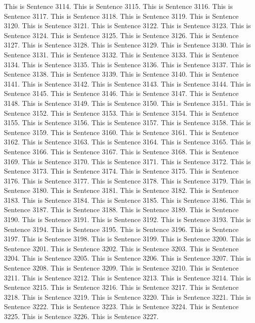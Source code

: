 \documentclass{article}
\begin{document}
This is Sentence 3114.
This is Sentence 3115.
This is Sentence 3116.
This is Sentence 3117.
This is Sentence 3118.
This is Sentence 3119.
This is Sentence 3120.
This is Sentence 3121.
This is Sentence 3122.
This is Sentence 3123.
This is Sentence 3124.
This is Sentence 3125.
This is Sentence 3126.
This is Sentence 3127.
This is Sentence 3128.
This is Sentence 3129.
This is Sentence 3130.
This is Sentence 3131.
This is Sentence 3132.
This is Sentence 3133.
This is Sentence 3134.
This is Sentence 3135.
This is Sentence 3136.
This is Sentence 3137.
This is Sentence 3138.
This is Sentence 3139.
This is Sentence 3140.
This is Sentence 3141.
This is Sentence 3142.
This is Sentence 3143.
This is Sentence 3144.
This is Sentence 3145.
This is Sentence 3146.
This is Sentence 3147.
This is Sentence 3148.
This is Sentence 3149.
This is Sentence 3150.
This is Sentence 3151.
This is Sentence 3152.
This is Sentence 3153.
This is Sentence 3154.
This is Sentence 3155.
This is Sentence 3156.
This is Sentence 3157.
This is Sentence 3158.
This is Sentence 3159.
This is Sentence 3160.
This is Sentence 3161.
This is Sentence 3162.
This is Sentence 3163.
This is Sentence 3164.
This is Sentence 3165.
This is Sentence 3166.
This is Sentence 3167.
This is Sentence 3168.
This is Sentence 3169.
This is Sentence 3170.
This is Sentence 3171.
This is Sentence 3172.
This is Sentence 3173.
This is Sentence 3174.
This is Sentence 3175.
This is Sentence 3176.
This is Sentence 3177.
This is Sentence 3178.
This is Sentence 3179.
This is Sentence 3180.
This is Sentence 3181.
This is Sentence 3182.
This is Sentence 3183.
This is Sentence 3184.
This is Sentence 3185.
This is Sentence 3186.
This is Sentence 3187.
This is Sentence 3188.
This is Sentence 3189.
This is Sentence 3190.
This is Sentence 3191.
This is Sentence 3192.
This is Sentence 3193.
This is Sentence 3194.
This is Sentence 3195.
This is Sentence 3196.
This is Sentence 3197.
This is Sentence 3198.
This is Sentence 3199.
This is Sentence 3200.
This is Sentence 3201.
This is Sentence 3202.
This is Sentence 3203.
This is Sentence 3204.
This is Sentence 3205.
This is Sentence 3206.
This is Sentence 3207.
This is Sentence 3208.
This is Sentence 3209.
This is Sentence 3210.
This is Sentence 3211.
This is Sentence 3212.
This is Sentence 3213.
This is Sentence 3214.
This is Sentence 3215.
This is Sentence 3216.
This is Sentence 3217.
This is Sentence 3218.
This is Sentence 3219.
This is Sentence 3220.
This is Sentence 3221.
This is Sentence 3222.
This is Sentence 3223.
This is Sentence 3224.
This is Sentence 3225.
This is Sentence 3226.
This is Sentence 3227.
\end{document}
